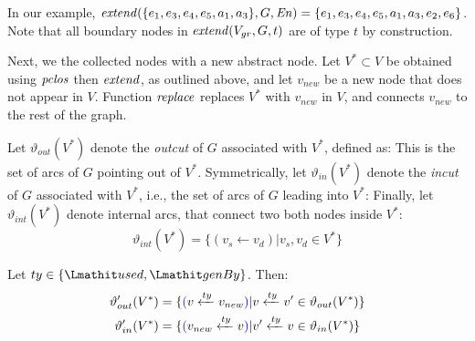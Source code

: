 
%
In our example, $\mathit{extend}(\{e_1, e_3, e_4, e_5, a_1, a_3\}, G, \mathit{En}) = \{e_1, e_3, e_4, e_5, a_1, a_3, e_2, e_6\}$.  Note that all boundary nodes in $\mathit{extend}(V_{gr}, G, t)$ are of type $t$ by construction.

Next, we   the collected nodes with a new abstract node.
%
Let $V^* \subset V$ be obtained using $\mathit{pclos}$ then $\mathit{extend}$, as outlined above, and let $v_{new}$ be a new node  that does not appear in $V$.
%
Function $\mathit{replace}$ replaces $V^*$ with $v_{new}$ in $V$, and connects $v_{new}$ to the rest of the graph.

Let $\vartheta_{out}(V^*)$ denote the \textit{outcut} of $G$ associated with $V^*$, defined as:
\jwb{\[ \vartheta_{out}(V^*) = \{  (v_d \leftarrow v_s) |   v_s \in  V^*, v_d \in V \setminus V^*\}\]}
This is the set of arcs of $G$ pointing out of $V^*$.
%
Symmetrically, let $\vartheta_{in}(V^*)$ denote the \textit{incut}  of $G$ associated with $V^*$, i.e., the set of arcs of $G$ leading into $V^*$:
\jwb{\[ \vartheta_{in}(V^*) = \{  (v_d\leftarrow v_s) |  v_d \in V^*, v_s \in  V \setminus V^* \}\]}
%
Finally, let $\vartheta_{int}(V^*)$ denote internal arcs, that connect two both nodes inside $V^*$:
\[ \vartheta_{int}(V^*) = \{  (v_s\leftarrow v_d) | v_s, v_d \in V^*\}\]


%


%

\begin{definition}
  Let $ty \in \{\used,  \wgby\}$. Then:
  \begin{align*}
\vartheta_{out}'(V^*) = \{ & \jwb{(}v \xleftarrow{ty}  v_{new} \jwb{)}|  v \xleftarrow{ty} v' \in \vartheta_{out}(V^*)  \}  \\
\vartheta_{in}'(V^*) = \{ & \jwb{(}v_{new} \xleftarrow{ty} v \jwb{)} | v' \xleftarrow{ty} v \in \vartheta_{in}(V^*)  \}   
\end{align*}
\label{def:eq:outcut}
\end{definition}

